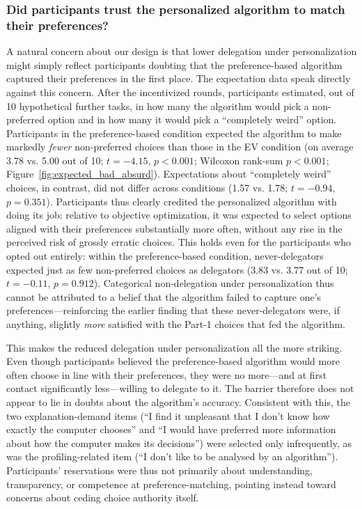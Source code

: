 \documentclass[a4paper, 12pt, fleqn]{article}
\theoremstyle{definition}
\begin{document}
\subsubsection*{Did participants trust the personalized algorithm to match their preferences?}
A natural concern about our design is that lower delegation under personalization might simply reflect participants doubting that the preference-based algorithm captured their preferences in the first place. The expectation data speak directly against this concern. After the incentivized rounds, participants estimated, out of 10 hypothetical further tasks, in how many the algorithm would pick a non-preferred option and in how many it would pick a ``completely weird'' option. Participants in the preference-based condition expected the algorithm to make markedly \emph{fewer} non-preferred choices than those in the EV condition (on average 3.78 vs. 5.00 out of 10; $t = -4.15$, $p < 0.001$; Wilcoxon rank-sum $p < 0.001$; Figure~\ref{fig:expected_bad_absurd}). Expectations about ``completely weird'' choices, in contrast, did not differ across conditions (1.57 vs. 1.78; $t = -0.94$, $p = 0.351$). Participants thus clearly credited the personalized algorithm with doing its job: relative to objective optimization, it was expected to select options aligned with their preferences substantially more often, without any rise in the perceived risk of grossly erratic choices. This holds even for the participants who opted out entirely: within the preference-based condition, never-delegators expected just as few non-preferred choices as delegators (3.83 vs. 3.77 out of 10; $t = -0.11$, $p = 0.912$). Categorical non-delegation under personalization thus cannot be attributed to a belief that the algorithm failed to capture one's preferences---reinforcing the earlier finding that these never-delegators were, if anything, slightly \emph{more} satisfied with the Part-1 choices that fed the algorithm.

This makes the reduced delegation under personalization all the more striking. Even though participants believed the preference-based algorithm would more often choose in line with their preferences, they were no more---and at first contact significantly less---willing to delegate to it. The barrier therefore does not appear to lie in doubts about the algorithm's accuracy. Consistent with this, the two explanation-demand items (``I find it unpleasant that I don't know how exactly the computer chooses'' and ``I would have preferred more information about how the computer makes its decisions'') were selected only infrequently, as was the profiling-related item (``I don't like to be analysed by an algorithm''). Participants' reservations were thus not primarily about understanding, transparency, or competence at preference-matching, pointing instead toward concerns about ceding choice authority itself.
\end{document}
